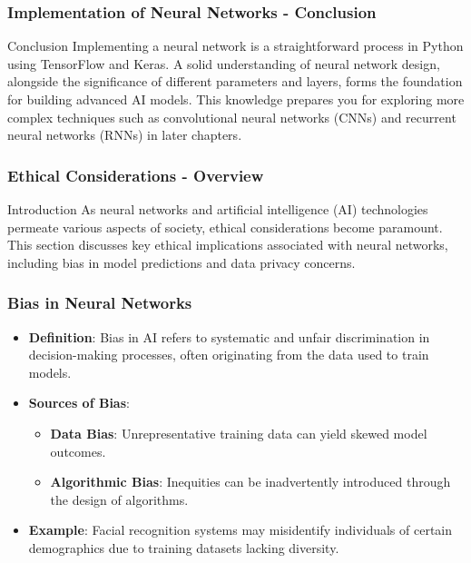 \documentclass[aspectratio=169]{beamer}
\begin{document}
\begin{frame}[fragile]
    \frametitle{Implementation of Neural Networks - Conclusion}
    \begin{block}{Conclusion}
        Implementing a neural network is a straightforward process in Python using TensorFlow and Keras. A solid understanding of neural network design, alongside the significance of different parameters and layers, forms the foundation for building advanced AI models. This knowledge prepares you for exploring more complex techniques such as convolutional neural networks (CNNs) and recurrent neural networks (RNNs) in later chapters.
    \end{block}
\end{frame}

\begin{frame}[fragile]
    \frametitle{Ethical Considerations - Overview}
    \begin{block}{Introduction}
        As neural networks and artificial intelligence (AI) technologies permeate various aspects of society, ethical considerations become paramount. This section discusses key ethical implications associated with neural networks, including bias in model predictions and data privacy concerns.
    \end{block}
\end{frame}

\begin{frame}[fragile]
    \frametitle{Bias in Neural Networks}
    \begin{itemize}
        \item \textbf{Definition}: Bias in AI refers to systematic and unfair discrimination in decision-making processes, often originating from the data used to train models.
        \item \textbf{Sources of Bias}:
        \begin{itemize}
            \item \textbf{Data Bias}: Unrepresentative training data can yield skewed model outcomes.
            \item \textbf{Algorithmic Bias}: Inequities can be inadvertently introduced through the design of algorithms.
        \end{itemize}
        \item \textbf{Example}: Facial recognition systems may misidentify individuals of certain demographics due to training datasets lacking diversity.
    \end{itemize}
\end{frame}
\end{document}
